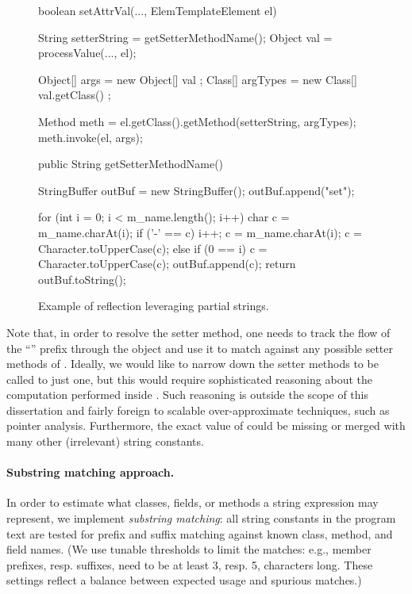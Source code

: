\begin{figure}[tb]
  \begin{javacode}
    boolean setAttrVal(..., ElemTemplateElement el) {
      String setterString = getSetterMethodName();
      Object val = processValue(..., el);

      Object[] args = new Object[]{ val };
      Class[] argTypes = new Class[]{ val.getClass() };

      Method meth = el.getClass().getMethod(setterString, argTypes);
      meth.invoke(el, args);
    }

    public String getSetterMethodName() {
      StringBuffer outBuf = new StringBuffer();
      outBuf.append("set");

      for (int i = 0; i < m_name.length(); i++) {
        char c = m_name.charAt(i);
        if ('-' == c) {
          i++;
          c = m_name.charAt(i);
          c = Character.toUpperCase(c);
        }
        else if (0 == i) {
          c = Character.toUpperCase(c);
        }
        outBuf.append(c);
      }
      return outBuf.toString();
    }
  \end{javacode}
  \caption{Example of reflection leveraging partial strings.}
  \label{reflection/figure:substrings}
\end{figure}

Note that, in order to resolve the setter method, one needs to track
the flow of the ``'' prefix through the
 object and use it to match against any possible
setter methods of .
%
Ideally, we would like to narrow down the setter methods to be called
to just one, but this would require sophisticated reasoning about the
computation performed inside . Such
reasoning is outside the scope of this dissertation and fairly foreign
to scalable over-approximate techniques, such as pointer
analysis. Furthermore, the exact value of  could be
missing or merged with many other (irrelevant) string constants.


\paragraph{Substring matching approach.}
In order to estimate what classes, fields, or methods a string
expression may represent, we implement \emph{substring matching}: all
string constants in the program text are tested for prefix and suffix
matching against known class, method, and field names. (We use
tunable thresholds to limit the matches: e.g., member prefixes,
resp. suffixes, need to be at least 3, resp. 5, characters long.
These settings reflect a balance between expected usage and spurious
matches.)


